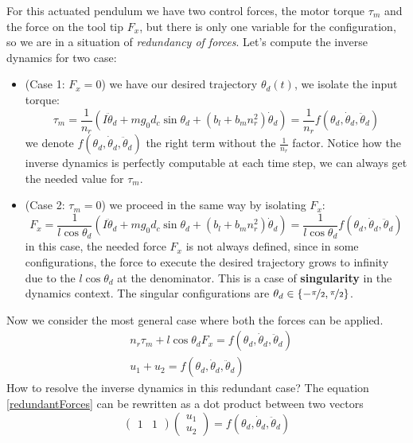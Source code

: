 \documentclass[10pt, a4paper]{report}
\begin{document}
For this actuated pendulum we have two control forces, the motor torque $\tau_m$ and the force on the tool tip $F_x$, but there is only one variable for the configuration, so we are in a situation of \textit{redundancy of forces}. Let's compute the inverse dynamics for two case:\begin{itemize}
    \item (Case 1: $F_x=0$) we have our desired trajectory $\theta_d(t)$, we isolate the input torque:\begin{equation}
        \tau_m=\frac{1}{n_r}\left(I\ddot\theta_d+mg_0d_c\sin\theta_d+(b_l+b_mn_r^2)\dot\theta_d\right)=\frac{1}{n_r}f(\theta_d,\dot\theta_d,\ddot\theta_d)
    \end{equation}
    we denote $f(\theta_d,\dot\theta_d,\ddot\theta_d)$ the right term without the $\frac{1}{n_r}$ factor. Notice how the inverse dynamics is perfectly computable at each time step, we can always get the needed value for $\tau_m$. 
    \item (Case 2: $\tau_m=0$) we proceed in the same way by isolating $F_x$:\begin{equation}
        F_x=\frac{1}{l\cos\theta_d}\left(I\ddot\theta_d+mg_0d_c\sin\theta_d+(b_l+b_mn_r^2)\dot\theta_d\right)=\frac{1}{l\cos\theta_d}f(\theta_d,\dot\theta_d,\ddot\theta_d)
    \end{equation}
    in this case, the needed force $F_x$ is not always defined, since in some configurations, the force to execute the desired trajectory grows to infinity due to the $l\cos\theta_d$ at the denominator. This is a case of \textbf{singularity} in the dynamics context. The singular configurations are $\theta_d\in\{-\nicefrac{\pi}{2},\nicefrac{\pi}{2}\}$.
\end{itemize}
Now we consider the most general case where both the forces can be applied.
\begin{align}
    &n_r\tau_m+l\cos\theta_dF_x=f(\theta_d,\dot\theta_d,\ddot\theta_d)\\
    &\label{redundantForces}u_1+u_2=f(\theta_d,\dot\theta_d,\ddot\theta_d)
\end{align}
How to resolve the inverse dynamics in this redundant case? The equation \eqref{redundantForces} can be rewritten as a dot product between two vectors\begin{equation}
    \begin{pmatrix}
        1&1
    \end{pmatrix}
      \begin{pmatrix}
        u_1\\u_2
    \end{pmatrix}=f(\theta_d,\dot\theta_d,\ddot\theta_d)
\end{equation}
\end{document}
